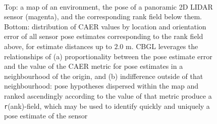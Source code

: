 \begin{figure}\vspace{0.4em}
  \subfloat{    \label{fig:a}} \vspace{-1.7cm}\\
  \subfloat{\hspace{-0.3cm} \label{fig:b}}
  \caption{\small
           Top: a map of an environment, the pose of a panoramic 2D LIDAR
           sensor (magenta), and the corresponding rank field below them.
           Bottom: distribution of CAER values by location and orientation
           error of all sensor pose estimates corresponding to the
           rank field above, for estimate distances up to $2.0$ m.
           CBGL leverages the relationships of (a) proportionality between the
           pose estimate error and the value of the CAER metric for pose
           estimates in a neighbourhood of the origin, and (b) indifference
           outside of that neighbourhood: pose hypotheses dispersed within the
           map and ranked ascendingly according to the value of that metric
           produce a \texttt{r}(ank)-field, which may be used to identify
           quickly and uniquely a pose estimate of the sensor%
           }
  \vspace{-0.75cm}
  \label{fig:AB}
\end{figure}
